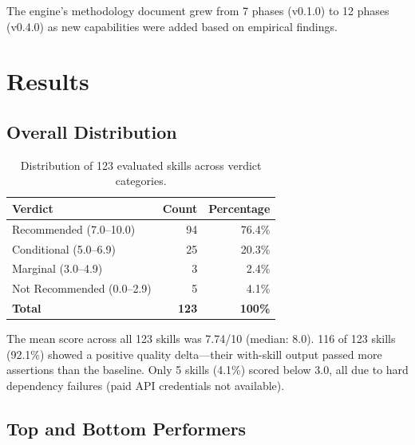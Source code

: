 \documentclass[11pt,a4paper]{article}
\begin{document}
The engine's methodology document grew from 7 phases (v0.1.0) to 12 phases (v0.4.0) as new capabilities were added based on empirical findings.

\section{Results}
\label{sec:results}

\subsection{Overall Distribution}

\begin{table}[h]
\centering
\caption{Distribution of 123 evaluated skills across verdict categories.}
\label{tab:distribution}
\begin{tabular}{lrr}
\toprule
\textbf{Verdict} & \textbf{Count} & \textbf{Percentage} \\
\midrule
Recommended (7.0--10.0) & 94 & 76.4\% \\
Conditional (5.0--6.9) & 25 & 20.3\% \\
Marginal (3.0--4.9) & 3 & 2.4\% \\
Not Recommended (0.0--2.9) & 5 & 4.1\% \\
\midrule
\textbf{Total} & \textbf{123} & \textbf{100\%} \\
\bottomrule
\end{tabular}
\end{table}

The mean score across all 123 skills was 7.74/10 (median: 8.0). 116 of 123 skills (92.1\%) showed a positive quality delta---their with-skill output passed more assertions than the baseline. Only 5 skills (4.1\%) scored below 3.0, all due to hard dependency failures (paid API credentials not available).

\subsection{Top and Bottom Performers}
\end{document}

